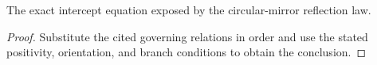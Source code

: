 \begin{lemma}
  \label{lem:physics:IPhO_2026_2_C_2:aux015}
  The exact intercept equation exposed by the circular-mirror reflection law.
\end{lemma}
\begin{proof}
  Substitute the cited governing relations in order and use the stated positivity, orientation, and branch conditions to obtain the conclusion.
\end{proof}
